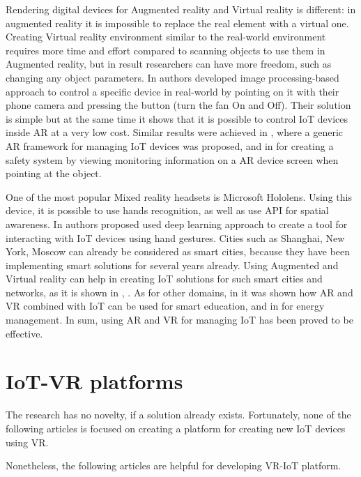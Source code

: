 Rendering digital devices for Augmented reality and Virtual reality is different: in augmented reality it is impossible to replace the real element with a virtual one. Creating Virtual reality environment similar to the real-world environment requires more time and effort compared to scanning objects to use them in Augmented reality, but in result researchers can have more freedom, such as changing any object parameters. 
In \cite{ankireddy_augmented_2019} authors developed image processing-based approach to control a specific device in real-world by pointing on it with their phone camera and pressing the button (turn the fan On and Off). Their solution is simple but at the same time it shows that it is possible to control IoT devices inside AR at a very low cost. Similar results were achieved in \cite{jo_-situ_2016}, where a generic AR framework for managing IoT devices was proposed, and in \cite{alam_augmented_2017} for creating a safety system by viewing monitoring information on a AR device screen when pointing at the object.

One of the most popular Mixed reality headsets is Microsoft Hololens. Using this device, it is possible to use hands recognition, as well as use API for spatial awareness. In \cite{sun_magichand_2019} authors proposed used deep learning approach to create a tool for interacting with IoT devices using hand gestures. 
Cities such as Shanghai, New York, Moscow can already be considered as smart cities, because they have been implementing smart solutions for several years already. Using Augmented and Virtual reality can help in creating IoT solutions for such smart cities and networks, as it is shown in \cite{chakareski_uav-iot_2019}, \cite{carneiro_bim_2018}. As for other domains, in \cite{paul_role_2019} it was shown how AR and VR combined with IoT can be used for smart education, and in \cite{jang_building_2019-1} for energy management. In sum, using AR and VR for managing IoT has been proved to be effective.

\section{IoT-VR platforms}

The research has no novelty, if a solution already exists. Fortunately, none of the following articles is focused on creating a platform for creating new IoT devices using VR.

Nonetheless, the following articles are helpful for developing VR-IoT platform.

